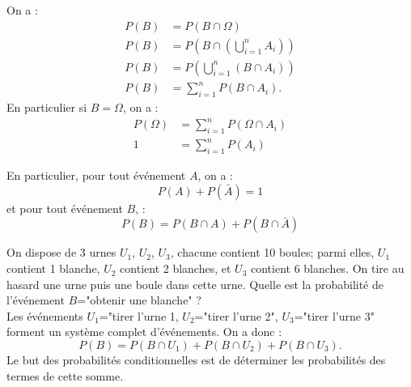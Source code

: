 \documentclass{book}
\begin{document}
\begin{Demonstration}
On a :
$$\begin{aligned}
P(B)&=P(B\cap \Omega )\\
P(B)&=P(B\cap \left(\bigcup\limits_{i=1}^n A_i\right ) )\\
P(B)&=P(\bigcup\limits_{i=1}^n (B\cap A_i))\\
P(B)&=\sum_{i=1}^n P(B\cap A_i).
\end{aligned}$$
En particulier si $B=\Omega$, on a :
$$\begin{aligned}
P(\Omega)&=\sum_{i=1}^n P(\Omega\cap A_i)\\
1&=\sum_{i=1}^n P(A_i)
\end{aligned}$$
\end{Demonstration}
\begin{Remarque}
En particulier, pour tout événement $A$, on a :
$$P(A)+P(\bar A)=1$$
et pour tout événement $B$, :
$$P(B) = P(B\cap A)+P(B\cap\bar A)$$
\end{Remarque}
\begin{Exemple}[3 urnes]
On dispose de 3 urnes $U_1$, $U_2$, $U_3$, chacune contient 10 boules; parmi elles, $U_1$ contient 1 blanche, $U_2$ contient 2 blanches, et $U_3$ contient 6 blanches. On tire au hasard une urne puis  une boule dans cette urne. Quelle est la probabilité de l'événement $B$="obtenir une blanche" ?\\
Les événements $U_1$="tirer l'urne 1,  $U_2$="tirer l'urne 2", $U_3$="tirer l'urne 3" forment un système complet d'événements. On a donc :
$$P(B)= P(B\cap U_1)+P(B\cap U_2)+P(B\cap U_3).$$
Le but des probabilités conditionnelles est de déterminer les probabilités des termes de cette somme.
\end{Exemple}
\end{document}

